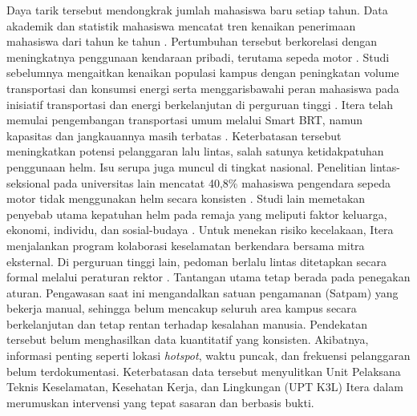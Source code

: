 Daya tarik tersebut mendongkrak jumlah mahasiswa baru setiap tahun. Data akademik dan statistik mahasiswa mencatat tren kenaikan penerimaan mahasiswa dari tahun ke tahun \cite{itera2025dashboard}. Pertumbuhan tersebut berkorelasi dengan meningkatnya penggunaan kendaraan pribadi, terutama sepeda motor \cite{purwanti2018analisisitenas}. Studi sebelumnya mengaitkan kenaikan populasi kampus dengan peningkatan volume transportasi dan konsumsi energi serta menggarisbawahi peran mahasiswa pada inisiatif transportasi dan energi berkelanjutan di perguruan tinggi \cite{rachmadian2024kesadaran}. Itera telah memulai pengembangan transportasi umum melalui Smart BRT, namun kapasitas dan jangkauannya masih terbatas \cite{antaranews2025brt}. Keterbatasan tersebut meningkatkan potensi pelanggaran lalu lintas, salah satunya ketidakpatuhan penggunaan helm. Isu serupa juga muncul di tingkat nasional. Penelitian lintas-seksional pada universitas lain mencatat 40,8\% mahasiswa pengendara sepeda motor tidak menggunakan helm secara konsisten \cite{safitri2020gambaran}. Studi lain memetakan penyebab utama kepatuhan helm pada remaja yang meliputi faktor keluarga, ekonomi, individu, dan sosial-budaya \cite{nobrihas2023kepatuhan}. Untuk menekan risiko kecelakaan, Itera menjalankan program kolaborasi keselamatan berkendara bersama mitra eksternal. Di perguruan tinggi lain, pedoman berlalu lintas ditetapkan secara formal melalui peraturan rektor \cite{iteranews2024kolaborasi,its2025pedoman}. Tantangan utama tetap berada pada penegakan aturan. Pengawasan saat ini mengandalkan satuan pengamanan (Satpam) yang bekerja manual, sehingga belum mencakup seluruh area kampus secara berkelanjutan dan tetap rentan terhadap kesalahan manusia. Pendekatan tersebut belum menghasilkan data kuantitatif yang konsisten. Akibatnya, informasi penting seperti lokasi \textit{hotspot}, waktu puncak, dan frekuensi pelanggaran belum terdokumentasi. Keterbatasan data tersebut menyulitkan Unit Pelaksana Teknis Keselamatan, Kesehatan Kerja, dan Lingkungan (UPT K3L) Itera dalam merumuskan intervensi yang tepat sasaran dan berbasis bukti.

